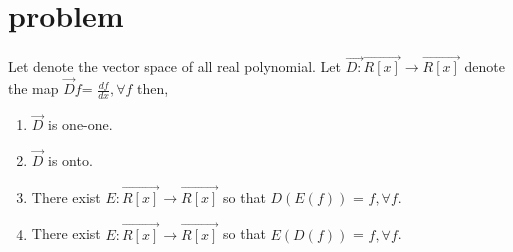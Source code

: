 \documentclass[journal,12pt]{IEEEtran}
\begin{document}
\section{problem}
Let  denote the vector space of all real polynomial. Let $\vec{D:}\vec{R[x]}\rightarrow \vec{R[x]}$ denote the map $\vec{D}f$= $\frac{df}{dx}, \forall f $ then,\\
\begin{enumerate}
\item $\vec{D}$ is one-one.
\item $\vec{D}$ is onto. 
\item There exist $E: \vec{R[x]} \rightarrow \vec{R[x]}$ so that $D(E(f))$ = $f, \forall f$.
\item There exist $E:\vec{R[x]} \rightarrow \vec{R[x]}$ so that $E(D(f))$ = $f, \forall f$.
\end{enumerate}
\end{document}

